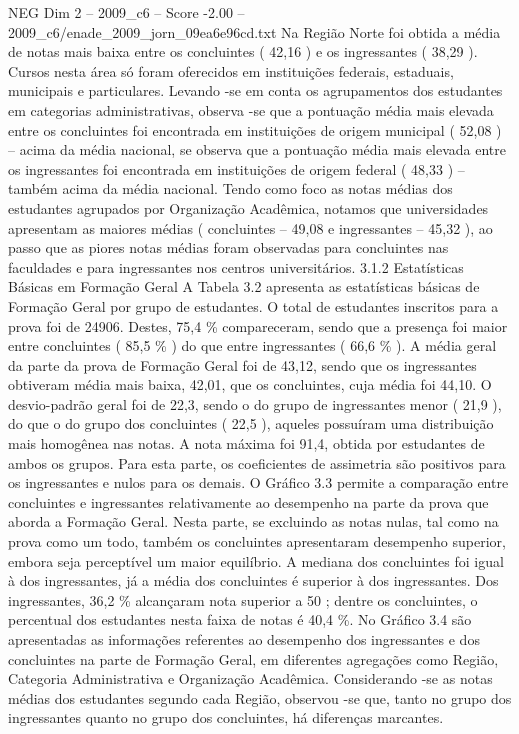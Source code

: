 \begin{textsample}{NEG Dim 2 – 2009\_c6 – Score -2.00 – 2009\_c6/enade\_2009\_jorn\_09ea6e96cd.txt}
Na Região Norte foi obtida a média de notas mais baixa entre os concluintes ( 42,16 ) e os ingressantes ( 38,29 ).
Cursos nesta área só foram oferecidos em instituições federais, estaduais, municipais e particulares.
Levando -se em conta os agrupamentos dos estudantes em categorias administrativas, observa -se que a pontuação média mais elevada entre os concluintes foi encontrada em instituições de origem municipal ( 52,08 ) – acima da média nacional, se observa que a pontuação média mais elevada entre os ingressantes foi encontrada em instituições de origem federal ( 48,33 ) – também acima da média nacional.
Tendo como foco as notas médias dos estudantes agrupados por Organização Acadêmica, notamos que universidades apresentam as maiores médias ( concluintes – 49,08 e ingressantes – 45,32 ), ao passo que as piores notas médias foram observadas para concluintes nas faculdades e para ingressantes nos centros universitários. 3.1.2 Estatísticas Básicas em Formação Geral A Tabela 3.2 apresenta as estatísticas básicas de Formação Geral por grupo de estudantes.
O total de estudantes inscritos para a prova foi de 24906.
Destes, 75,4 \% compareceram, sendo que a presença foi maior entre concluintes ( 85,5 \% ) do que entre ingressantes ( 66,6 \% ).
A média geral da parte da prova de Formação Geral foi de 43,12, sendo que os ingressantes obtiveram média mais baixa, 42,01, que os concluintes, cuja média foi 44,10.
O desvio-padrão geral foi de 22,3, sendo o do grupo de ingressantes menor ( 21,9 ), do que o do grupo dos concluintes ( 22,5 ), aqueles possuíram uma distribuição mais homogênea nas notas.
A nota máxima foi 91,4, obtida por estudantes de ambos os grupos.
Para esta parte, os coeficientes de assimetria são positivos para os ingressantes e nulos para os demais.
O Gráfico 3.3 permite a comparação entre concluintes e ingressantes relativamente ao desempenho na parte da prova que aborda a Formação Geral.
Nesta parte, se excluindo as notas nulas, tal como na prova como um todo, também os concluintes apresentaram desempenho superior, embora seja perceptível um maior equilíbrio.
A mediana dos concluintes foi igual à dos ingressantes, já a média dos concluintes é superior à dos ingressantes.
Dos ingressantes, 36,2 \% alcançaram nota superior a 50 ; dentre os concluintes, o percentual dos estudantes nesta faixa de notas é 40,4 \%.
No Gráfico 3.4 são apresentadas as informações referentes ao desempenho dos ingressantes e dos concluintes na parte de Formação Geral, em diferentes agregações como Região, Categoria Administrativa e Organização Acadêmica.
Considerando -se as notas médias dos estudantes segundo cada Região, observou -se que, tanto no grupo dos ingressantes quanto no grupo dos concluintes, há diferenças marcantes.

\end{textsample}
